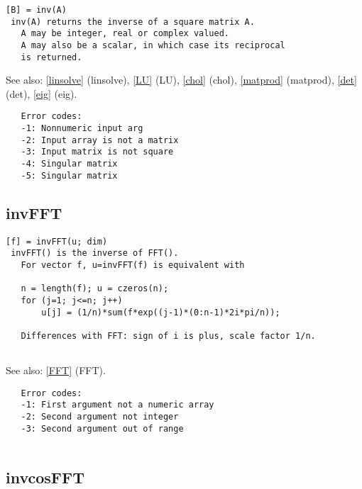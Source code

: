 \documentclass[a4paper]{article}
\begin{document}
\begin{tscreen}
\begin{verbatim}
[B] = inv(A)
 inv(A) returns the inverse of a square matrix A.
   A may be integer, real or complex valued.
   A may also be a scalar, in which case its reciprocal
   is returned.
\end{verbatim}

See also: \ref{linsolve} {(linsolve)}, \ref{LU} {(LU)}, \ref{chol} {(chol)}, \ref{matprod} {(matprod)}, \ref{det} {(det)}, \ref{eig} {(eig)}.
\begin{verbatim}
   Error codes:
   -1: Nonnumeric input arg
   -2: Input array is not a matrix
   -3: Input matrix is not square
   -4: Singular matrix
   -5: Singular matrix 
\end{verbatim}
\end{tscreen}





\subsection{invFFT\label{invFFT}}

\begin{tscreen}
\begin{verbatim}
[f] = invFFT(u; dim)
 invFFT() is the inverse of FFT().
   For vector f, u=invFFT(f) is equivalent with

   n = length(f); u = czeros(n);
   for (j=1; j<=n; j++)
       u[j] = (1/n)*sum(f*exp((j-1)*(0:n-1)*2i*pi/n));

   Differences with FFT: sign of i is plus, scale factor 1/n.
   
\end{verbatim}

See also: \ref{FFT} {(FFT)}.
\begin{verbatim}
   Error codes:
   -1: First argument not a numeric array
   -2: Second argument not integer
   -3: Second argument out of range
   
\end{verbatim}
\end{tscreen}





\subsection{invcosFFT\label{invcosFFT}}
\end{document}
